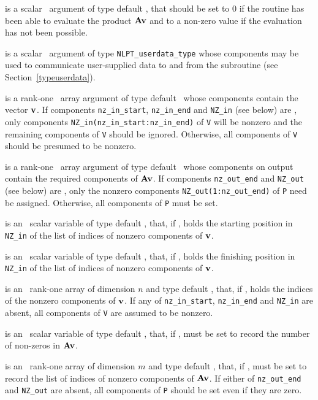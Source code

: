 \documentclass{galahad}
\begin{document}
\begin{description}
 is a scalar \intentout\ argument of type default \integer,
that should be set to 0 if the routine has been able to evaluate the
product ${\mathbf{A}} {\mathbf{v}}$
and to a non-zero value if the evaluation has not been possible.

 is a scalar \intentinout\ argument of type
{\tt NLPT\_userdata\_type} whose components may be used
to communicate user-supplied data to and from the
subroutine (see Section~\ref{typeuserdata}).

 is a rank-one \intentin\ array argument of type default \realdp\
whose components contain the vector ${\mathbf{v}}$.
If components
{\tt nz\_in\_start},
{\tt nz\_in\_end}
and
{\tt NZ\_in}
(see below) are \present,
only components {\tt NZ\_in(nz\_in\_start:nz\_in\_end)} of {\tt V}
will be nonzero and the remaining components of {\tt V} should be
ignored. Otherwise, all components of {\tt V} should be presumed to be nonzero.

 is a rank-one \intentout\ array argument of type default \realdp\
whose components on output contain the required components of ${\mathbf{A}} {\mathbf{v}}$.
If components
{\tt nz\_out\_end}
and
{\tt NZ\_out}
(see below) are \present,
only the nonzero components {\tt NZ\_out(1:nz\_out\_end)} of {\tt P}
need be assigned.
Otherwise, all components of {\tt P} must be set.

 is an \optional\ scalar variable of type default \integer,
that, if \present, holds the starting position in {\tt NZ\_in}
of the list of indices of nonzero components of ${\mathbf{v}}$.

 is an \optional\ scalar variable of type default \integer,
that, if \present, holds the finishing position in {\tt NZ\_in}
of the list of indices of nonzero components of ${\mathbf{v}}$.

 is an \optional\  rank-one array of dimension $n$
and type default \integer, that, if \present, holds the indices of the
nonzero components of ${\mathbf{v}}$. If any of
{\tt nz\_in\_start},
{\tt nz\_in\_end}
and
{\tt NZ\_in}
are absent, all components of {\tt V} are assumed to be nonzero.

\itt{nz\_out\_end} is an \optional\ scalar variable of type default \integer,
that, if \present, must be set to record the number of non-zeros in
${\mathbf{A}} {\mathbf{v}}$.

 is an \optional\ rank-one array of dimension $m$
and type default \integer, that, if \present, must be set to record the list
of indices of nonzero components of ${\mathbf{A}} {\mathbf{v}}$.
If either of
{\tt nz\_out\_end}
and
{\tt NZ\_out}
are absent, all components of {\tt P} should be set even if they are zero.


\end{description}
\end{document}
